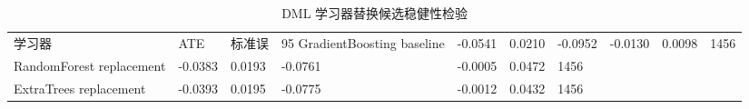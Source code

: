 \begin{table}
\caption{DML 学习器替换候选稳健性检验}
\label{tab:dml_learner_replacement_candidate}
\begin{tabular}{lllllll}
\toprule
学习器 & ATE & 标准误 & 95%
\midrule
GradientBoosting baseline & -0.0541 & 0.0210 & -0.0952 & -0.0130 & 0.0098 & 1456 \\
RandomForest replacement & -0.0383 & 0.0193 & -0.0761 & -0.0005 & 0.0472 & 1456 \\
ExtraTrees replacement & -0.0393 & 0.0195 & -0.0775 & -0.0012 & 0.0432 & 1456 \\
\bottomrule
\end{tabular}
\end{table}
